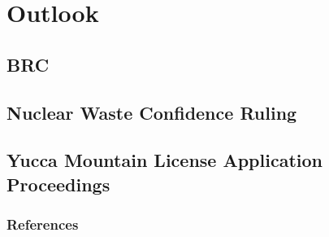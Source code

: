 \documentclass{beamer}
\begin{document}
\section{Outlook}
\subsection{BRC}

\subsection{Nuclear Waste Confidence Ruling}

\subsection{Yucca Mountain License Application Proceedings}




\begin{frame}[allowframebreaks]
  \frametitle{References}
  
  {\footnotesize  }

\end{frame}

\end{document}
